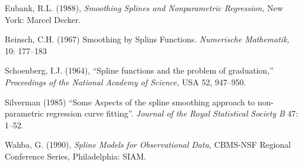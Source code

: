 \begin{thebibliography}{}


Eubank, R.L. (1988), {\it Smoothing Splines and Nonparametric
  Regression,} New York: Marcel Decker.

 Reinsch, C.H. (1967) Smoothing by Splins Functions. {\it Numerische
Mathematik,} 10: 177--183


Schoenberg, I.J. (1964), ``Spline functions and the problem of
graduation,'' {\it Proceedings of the National Academy of Science,}
USA 52, 947--950.
 
Silverman (1985) ``Some Aspects of the spline smoothing approach to
non-parametric regression curve fitting''. {\it Journal of the Royal
  Statistical Society B} 47: 1--52.

Wahba, G. (1990), {\it Spline Models for Observational Data,} CBMS-NSF
Regional Conference Series, Philadelphia: SIAM.


\end{thebibliography}
